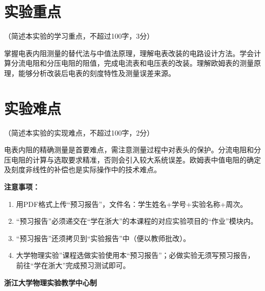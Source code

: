 \documentclass[10pt,a4paper]{ctexart}
\newcommand{\myspace}[1]{\par\vspace{#1\baselineskip}} %
\newcommand{\sihao}{\fontsize{14pt}{18pt}\selectfont}
\newcommand{\xiaosi}{\fontsize{12pt}{16pt}\selectfont}
\begin{document}
    \section{实验重点}
    
    \xiaosi（简述本实验的学习重点，不超过100字，3分）

掌握电表内阻测量的替代法与中值法原理，理解电表改装的电路设计方法。学会计算分流电阻和分压电阻的阻值，完成电流表和电压表的改装。理解欧姆表的测量原理，能够分析改装后电表的刻度特性及测量误差来源。

    \myspace{2}
    
    \section{实验难点}

    \xiaosi（简述本实验的实现难点，不超过100字，2分）

    电表内阻的精确测量是首要难点，需注意测量过程中对表头的保护。分流电阻和分压电阻的计算与选取要求精准，否则会引入较大系统误差。欧姆表中值电阻的确定及刻度非线性的补偿也是实际操作中的技术难点。
\myspace{2}


\newpage

\sihao\textbf{注意事项：}
\xiaosi
\begin{enumerate}
    \item 用PDF格式上传“预习报告”，文件名：学生姓名+学号+实验名称+周次。
    \item “预习报告”必须递交在“学在浙大”的本课程的对应实验项目的“作业”模块内。
    \item “预习报告”还须拷贝到“实验报告”中（便以教师批改）。
    \item 大学物理实验”课程选做实验使用本“预习报告”；必做实验无须写预习报告，前往“学在浙大”完成预习测试即可。
\end{enumerate}

\vspace{1cm}
\xiaosi\centering \textbf{浙江大学物理实验教学中心制}
\end{document}
